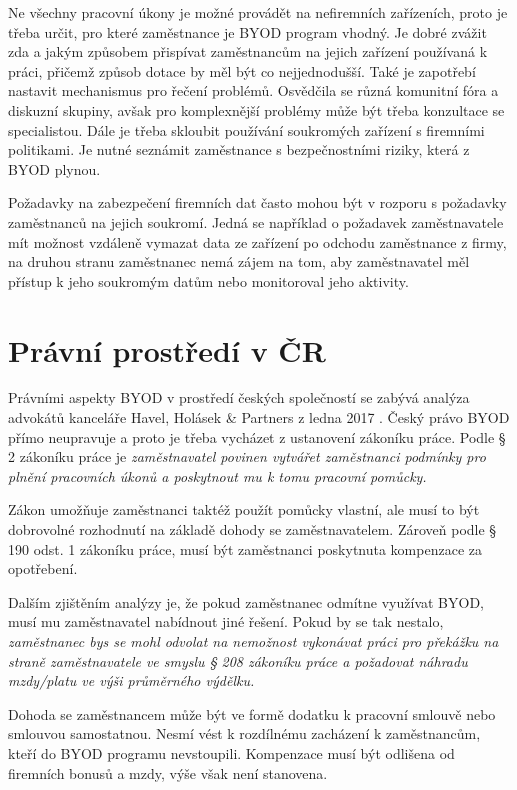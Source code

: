Ne všechny pracovní úkony je možné provádět na nefiremních zařízeních, proto je třeba určit, pro které zaměstnance je BYOD program vhodný. 
Je dobré zvážit zda a jakým způsobem přispívat zaměstnancům na jejich zařízení používaná k práci, přičemž způsob dotace by měl být co nejjednodušší. Také je zapotřebí nastavit mechanismus pro řečení problémů. Osvědčila se různá komunitní fóra a diskuzní skupiny, avšak pro komplexnější problémy může být třeba konzultace se specialistou. Dále je třeba skloubit používání soukromých zařízení s firemními politikami. Je nutné seznámit zaměstnance s bezpečnostními riziky, která z BYOD plynou. 

Požadavky na zabezpečení firemních dat často mohou být v rozporu s požadavky zaměstnanců na jejich soukromí. Jedná se například o požadavek zaměstnavatele mít možnost vzdáleně vymazat data ze zařízení po odchodu zaměstnance z firmy, na druhou stranu zaměstnanec nemá zájem na tom, aby zaměstnavatel měl přístup k jeho soukromým datům nebo monitoroval jeho aktivity.

\section{Právní prostředí v ČR}

Právními aspekty BYOD v prostředí českých společností se zabývá analýza advokátů kanceláře Havel, Holásek \& Partners z ledna 2017 \cite{pravniProstor}. Český právo BYOD přímo neupravuje a proto je třeba vycházet z ustanovení zákoníku práce. Podle § 2 zákoníku práce je \textit{zaměstnavatel povinen vytvářet zaměstnanci podmínky pro plnění pracovních úkonů a poskytnout mu k tomu pracovní pomůcky.}

Zákon umožňuje zaměstnanci taktéž použít pomůcky vlastní, ale musí to být dobrovolné rozhodnutí na základě dohody se zaměstnavatelem. Zároveň podle § 190 odst. 1  zákoníku práce, musí být zaměstnanci poskytnuta kompenzace za opotřebení.

Dalším zjištěním analýzy je, že pokud zaměstnanec odmítne využívat BYOD, musí mu zaměstnavatel nabídnout jiné řešení. Pokud by se tak nestalo, \textit{zaměstnanec bys se mohl odvolat na nemožnost vykonávat práci pro překážku na straně zaměstnavatele ve smyslu § 208 zákoníku práce a požadovat náhradu mzdy/platu ve výši průměrného výdělku.}

Dohoda se zaměstnancem může být ve formě dodatku k pracovní smlouvě nebo smlouvou samostatnou. Nesmí vést k rozdílnému zacházení k zaměstnancům, kteří do BYOD programu nevstoupili. Kompenzace musí být odlišena od firemních bonusů a mzdy, výše však není stanovena. 

